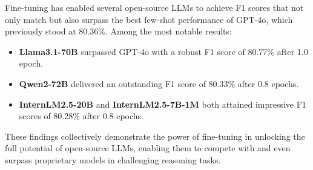 Fine-tuning has enabled several open-source LLMs to achieve F1 scores that not only match but also surpass the best few-shot performance of GPT-4o, which previously stood at 80.36\%. Among the most notable results:

\begin{itemize}
    \item \textbf{Llama3.1-70B} surpassed GPT-4o with a robust F1 score of 80.77\% after 1.0 epoch.
    \item \textbf{Qwen2-72B} delivered an outstanding F1 score of 80.33\% after 0.8 epochs.
    \item \textbf{InternLM2.5-20B} and \textbf{InternLM2.5-7B-1M} both attained impressive F1 scores of 80.28\% after 0.8 epochs.
\end{itemize}




These findings collectively demonstrate the power of fine-tuning in unlocking the full potential of open-source LLMs, enabling them to compete with and even surpass proprietary models in challenging reasoning tasks. 

